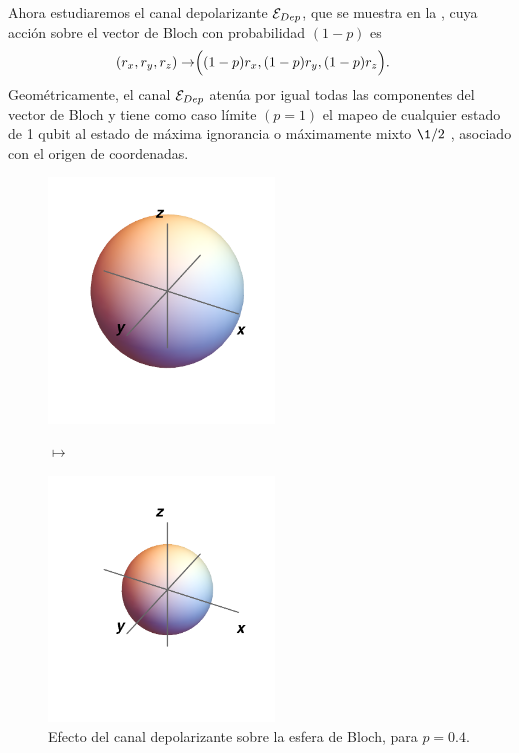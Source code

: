Ahora estudiaremos el canal depolarizante $\mathcal{E}_{Dep}$, que se muestra
en la , cuya acción sobre el 
vector de Bloch con probabilidad $(1-p)$ es 
\begin{align}
\qty(r_x,r_y,r_z)\rightarrow&\Big(\qty(1-p)r_x,\qty(1-p)r_y,\qty(1-p)r_z\Big).
\label{eq:depolarizing-bloch-vec}
\end{align}
Geométricamente, el canal $\mathcal{E}_{Dep}$ atenúa por igual todas las 
componentes del vector de Bloch y tiene como caso límite $(p=1)$
el mapeo de cualquier estado de 1 qubit al estado 
de máxima ignorancia o máximamente mixto $\1/2$
\cite{bengtsson_zyczkowski_2017}, asociado con el origen de coordenadas.
\begin{figure}[H]
    \centering
    \begin{minipage}{.4\textwidth}
        \centering
        \includegraphics[width=6cm]{images/bloch-ball}
    \end{minipage}
    $\longmapsto$
    \begin{minipage}{0.4\textwidth}
        \centering
        \includegraphics[width=6cm]{images/depolarizing}
    \end{minipage}
    \caption{Efecto del canal depolarizante sobre la esfera de Bloch, 
    para $p=0.4$.}
    \label{fig:depolarizing}
\end{figure}
